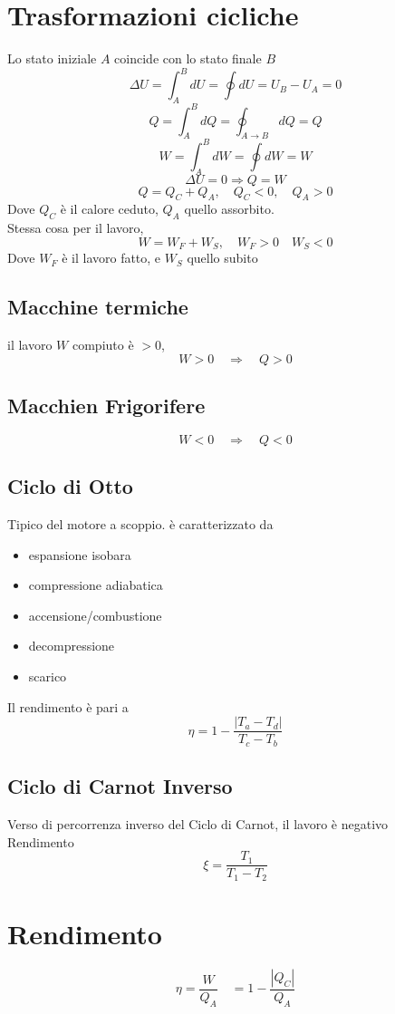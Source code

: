 \documentclass[a4paper]{report}
\begin{document}
  \section{Trasformazioni cicliche}
  Lo stato iniziale $A$ coincide con lo stato finale $B$
  \[ \Delta U = \int_A^B dU = \oint dU = U_B - U_A = 0 \]
  \[ Q = \int_A^B dQ = \oint_{A \rightarrow B} dQ = Q \]
  \[ W = \int_A^B dW = \oint dW = W \]
  \[ \Delta U = 0 \Rightarrow Q = W \]
  \[ Q = Q_C + Q_A,  \quad Q_C < 0, \quad Q_A > 0 \]
  Dove $Q_C$ è il calore ceduto, $Q_A$ quello assorbito.\\
  Stessa cosa per il lavoro,
  \[ W = W_F + W_S, \quad W_F > 0  \quad W_S < 0 \]
  Dove $W_F$ è il lavoro fatto, e $W_S$ quello subito
  \subsection{Macchine termiche}
  il lavoro $W$ compiuto è $>0$,
  \[ W>0 \quad \Rightarrow \quad Q > 0 \]
  \subsection{Macchien Frigorifere}
  \[ W<0 \quad \Rightarrow \quad Q < 0 \]

  \subsection{Ciclo di Otto}
  Tipico del motore a scoppio. è caratterizzato da
  \begin{itemize}
    \item espansione isobara
    \item compressione adiabatica
    \item accensione/combustione
    \item decompressione
    \item scarico
  \end{itemize}
  Il rendimento è pari a
  \[ \eta = 1 - \frac{|T_a - T_d|}{T_c - T_b} \]

  \subsection{Ciclo di Carnot Inverso}
  Verso di percorrenza inverso del Ciclo di Carnot, il lavoro è negativo \\
  Rendimento
  \[ \xi = \frac{T_1}{T_1 - T_2} \]

  \section{Rendimento}
  \[ \eta=\frac{W}{Q_A} \quad = 1- \frac{|Q_C|}{Q_A}\]
\end{document}

